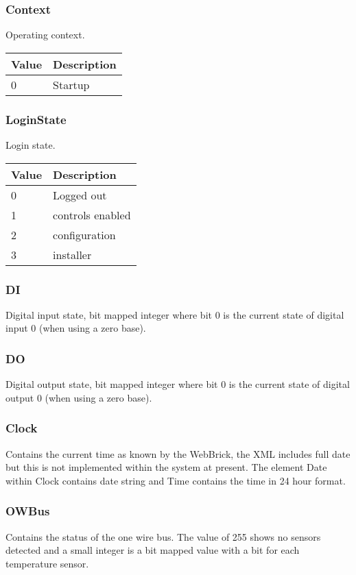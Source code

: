 \subsubsection {Context}
Operating context.

    \begin{tabular}{l|l}
    Value&Description\\
    \hline
    0&Startup\\
    \end{tabular}

\subsubsection {LoginState}
Login state.

    \begin{tabular}{l|l}
    Value&Description\\
    \hline
    0&Logged out\\
    1&controls enabled\\
    2&configuration\\
    3&installer\\
    \end{tabular}

\subsubsection {DI}
Digital input state, bit mapped integer where bit 0 is the current state of digital input 0 (when using a zero base). 

\subsubsection {DO}
Digital output state, bit mapped integer where bit 0 is the current state of digital output 0 (when using a zero base). 

\subsubsection {Clock}
Contains the current time as known by the WebBrick, the XML includes full date but this is not implemented within the
system at present. The element Date within Clock contains date string and Time contains the time in 24 hour format.
	
\subsubsection {OWBus}
Contains the status of the one wire bus. The value of 255 shows no sensors detected and a small integer is a bit mapped 
value with a bit for each temperature sensor.

